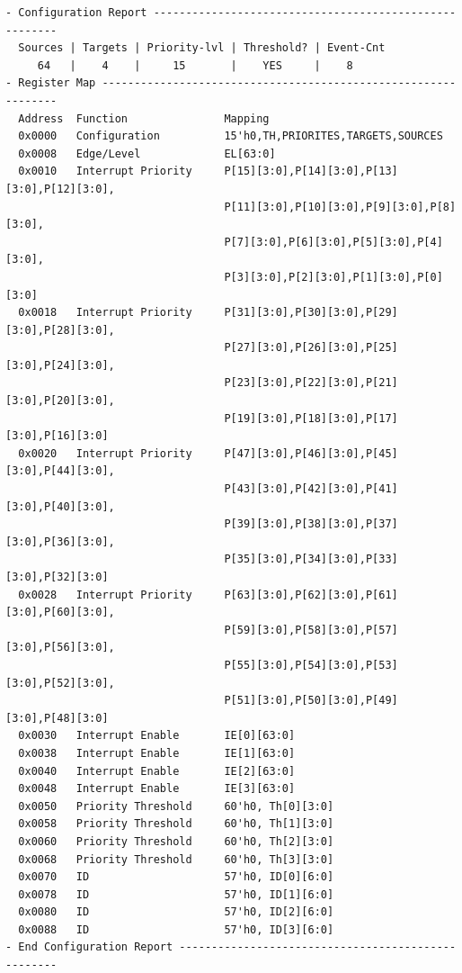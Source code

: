 \begin{verbatim}
- Configuration Report -------------------------------------------------------
  Sources | Targets | Priority-lvl | Threshold? | Event-Cnt  
     64   |    4    |     15       |    YES     |    8       
- Register Map ---------------------------------------------------------------
  Address  Function               Mapping
  0x0000   Configuration          15'h0,TH,PRIORITES,TARGETS,SOURCES
  0x0008   Edge/Level             EL[63:0]
  0x0010   Interrupt Priority     P[15][3:0],P[14][3:0],P[13][3:0],P[12][3:0],
                                  P[11][3:0],P[10][3:0],P[9][3:0],P[8][3:0],
                                  P[7][3:0],P[6][3:0],P[5][3:0],P[4][3:0],
                                  P[3][3:0],P[2][3:0],P[1][3:0],P[0][3:0]
  0x0018   Interrupt Priority     P[31][3:0],P[30][3:0],P[29][3:0],P[28][3:0],
                                  P[27][3:0],P[26][3:0],P[25][3:0],P[24][3:0],
                                  P[23][3:0],P[22][3:0],P[21][3:0],P[20][3:0],
                                  P[19][3:0],P[18][3:0],P[17][3:0],P[16][3:0]
  0x0020   Interrupt Priority     P[47][3:0],P[46][3:0],P[45][3:0],P[44][3:0],
                                  P[43][3:0],P[42][3:0],P[41][3:0],P[40][3:0],
                                  P[39][3:0],P[38][3:0],P[37][3:0],P[36][3:0],
                                  P[35][3:0],P[34][3:0],P[33][3:0],P[32][3:0]
  0x0028   Interrupt Priority     P[63][3:0],P[62][3:0],P[61][3:0],P[60][3:0],
                                  P[59][3:0],P[58][3:0],P[57][3:0],P[56][3:0],
                                  P[55][3:0],P[54][3:0],P[53][3:0],P[52][3:0],
                                  P[51][3:0],P[50][3:0],P[49][3:0],P[48][3:0]
  0x0030   Interrupt Enable       IE[0][63:0]
  0x0038   Interrupt Enable       IE[1][63:0]
  0x0040   Interrupt Enable       IE[2][63:0]
  0x0048   Interrupt Enable       IE[3][63:0]
  0x0050   Priority Threshold     60'h0, Th[0][3:0]
  0x0058   Priority Threshold     60'h0, Th[1][3:0]
  0x0060   Priority Threshold     60'h0, Th[2][3:0]
  0x0068   Priority Threshold     60'h0, Th[3][3:0]
  0x0070   ID                     57'h0, ID[0][6:0]
  0x0078   ID                     57'h0, ID[1][6:0]
  0x0080   ID                     57'h0, ID[2][6:0]
  0x0088   ID                     57'h0, ID[3][6:0]
- End Configuration Report ---------------------------------------------------
\end{verbatim}
